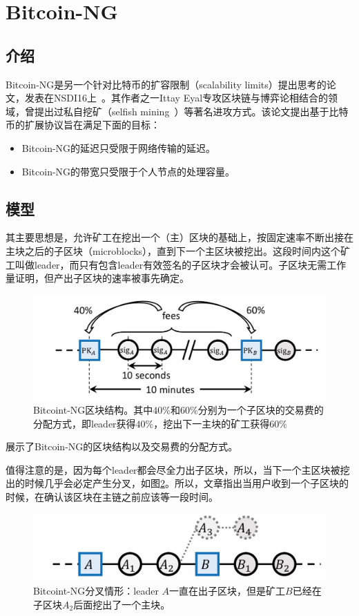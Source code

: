 \section{Bitcoin-NG}
\subsection{介绍}
Bitcoin-NG是另一个针对比特币的扩容限制（scalability limits）提出思考的论文，发表在NSDI16上~\cite{eyal2016bitcoin}。其作者之一Ittay Eyal专攻区块链与博弈论相结合的领域，曾提出过私自挖矿（selfish mining~\cite{eyal2018majority}）等著名进攻方式。该论文提出基于比特币的扩展协议旨在满足下面的目标：
\begin{itemize}
	\item Bitcoin-NG的延迟只受限于网络传输的延迟。
	\item Bitcoin-NG的带宽只受限于个人节点的处理容量。
\end{itemize}

\subsection{模型}
其主要思想是，允许矿工在挖出一个（主）区块的基础上，按固定速率不断出接在主块之后的子区块（microblocks），直到下一个主区块被挖出。这段时间内这个矿工叫做leader，而只有包含leader有效签名的子区块才会被认可。子区块无需工作量证明，但产出子区块的速率被事先确定。

\begin{figure}
	\centering
	\includegraphics[width=0.7 \textwidth]{../common/BTCNG_1.png}
	\caption{Bitcoint-NG区块结构。其中$40\%$和$60\%$分别为一个子区块的交易费的分配方式，即leader获得$40\%$，挖出下一主块的矿工获得$60\%$} 
	\label{fig:BTCNG1}
\end{figure}
展示了Bitcoin-NG的区块结构以及交易费的分配方式。

值得注意的是，因为每个leader都会尽全力出子区块，所以，当下一个主区块被挖出的时候几乎会必定产生分叉，如图\ref{fig:BTCNG2}。所以，文章指出当用户收到一个子区块的时候，在确认该区块在主链之前应该等一段时间。
\begin{figure}
	\centering
	\includegraphics[width=0.7	\textwidth]{../common/BTCNG_2.png}
	\caption{Bitcoint-NG分叉情形：leader $A$一直在出子区块，但是矿工$B$已经在子区块$A_2$后面挖出了一个主块。} 
	\label{fig:BTCNG2}
\end{figure}

